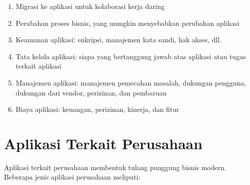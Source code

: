 \begin{enumerate}
	\item Migrasi ke aplikasi untuk kolaborasi kerja daring
	\item Perubahan proses bisnis, yang mungkin menyebabkan perubahan aplikasi
	\item Keamanan aplikasi: enkripsi, manajemen kata sandi, hak akses, dll.
	\item Tata kelola aplikasi: siapa yang bertanggung jawab atas aplikasi atau tugas terkait aplikasi
	\item Manajemen aplikasi: manajemen pemecahan masalah, dukungan pengguna, dukungan dari vendor, perizinan, dan pembaruan
	\item Biaya aplikasi: keuangan, perizinan, kinerja, dan fitur
\end{enumerate}

\section{Aplikasi Terkait Perusahaan}
Aplikasi terkait perusahaan membentuk tulang punggung bisnis modern. Beberapa jenis aplikasi perusahaan meliputi:

